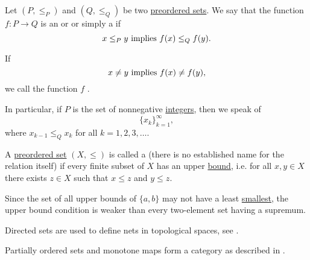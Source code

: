 \begin{definition}\label{def:monotone_map}
  Let \( (P, \leq_P) \) and \( (Q, \leq_Q) \) be two \hyperref[def:preordered_set]{preordered sets}. We say that the function \( f: P \to Q \) is an  or  or simply a  if
  \begin{equation*}
    x \leq_P y \text{ implies } f(x) \leq_Q f(y).
  \end{equation*}

  If
  \begin{equation*}
    x \neq y \text{ implies } f(x) \neq f(y),
  \end{equation*}
  we call the function \( f \) .

  In particular, if \( P \) is the set of nonnegative \hyperref[def:integers]{integers}, then we speak of 
  \begin{equation*}
    \{ x_k \}_{k=1}^\infty,
  \end{equation*}
  where \( x_{k-1} \leq_Q x_k \) for all \( k = 1, 2, 3, \ldots \).
\end{definition}

\begin{definition}\label{def:directed_set}
  A \hyperref[def:preordered_set]{preordered set} \( (X, \leq) \) is called a  (there is no established name for the relation itself) if every finite subset of \( X \) has an upper \hyperref[def:preordered_set/upper_lower_bound]{bound}, i.e. for all \( x, y \in X \) there exists \( z \in X \) such that \( x \leq z \) and \( y \leq z \).

  Since the set of all upper bounds of \( \{ a, b \} \) may not have a least \hyperref[def:preordered_set/largest_smallest_element]{smallest}, the upper bound condition is weaker than every two-element set having a supremum.

  Directed sets are used to define nets in topological spaces, see .
\end{definition}

\begin{definition}\label{def:category_of_preordered_sets}
  Partially ordered sets and monotone maps form a category as described in .
\end{definition}
